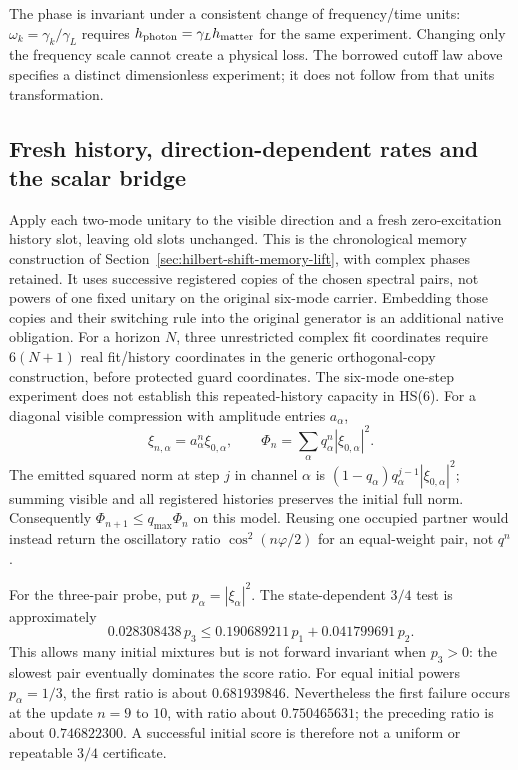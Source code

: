 \documentclass[11pt,a4paper]{article}
\begin{document}
The phase is invariant under a consistent change of frequency/time
units: $\omega_k=\gamma_k/\gamma_L$ requires
$h_{\rm photon}=\gamma_L h_{\rm matter}$ for the same experiment.
Changing only the frequency scale cannot create a physical loss.
The borrowed cutoff law above specifies a distinct dimensionless
experiment; it does not follow from that units transformation.

\subsection{Fresh history, direction-dependent rates and the scalar bridge}
Apply each two-mode unitary to the visible direction and a fresh
zero-excitation history slot, leaving old slots unchanged. This is
the chronological memory construction of
Section~\ref{sec:hilbert-shift-memory-lift}, with complex phases retained.
It uses successive registered copies of the chosen spectral pairs,
not powers of one fixed unitary on the original six-mode carrier.
Embedding those copies and their switching rule into the original
generator is an additional native obligation. For a horizon $N$,
three unrestricted complex fit coordinates require $6(N+1)$ real
fit/history coordinates in the generic orthogonal-copy construction,
before protected guard coordinates. The six-mode one-step experiment
does not establish this repeated-history capacity in HS(6).
For a diagonal visible compression with amplitude entries $a_\alpha$,
\[
 \xi_{n,\alpha}=a_\alpha^n\xi_{0,\alpha},\qquad
 \Phi_n=\sum_\alpha q_\alpha^n|\xi_{0,\alpha}|^2.
\]
The emitted squared norm at step $j$ in channel $\alpha$ is
$(1-q_\alpha)q_\alpha^{j-1}|\xi_{0,\alpha}|^2$; summing visible
and all registered histories preserves the initial full norm.
Consequently $\Phi_{n+1}\le q_{\max}\Phi_n$ on this model.
Reusing one occupied partner would instead return the oscillatory
ratio $\cos^2(n\varphi/2)$ for an equal-weight pair, not $q^n$.

For the three-pair probe, put $p_\alpha=|\xi_\alpha|^2$.
The state-dependent $3/4$ test is approximately
\[
 0.028308438\,p_3
 \le0.190689211\,p_1+0.041799691\,p_2.
\]
This allows many initial mixtures but is not forward invariant when
$p_3>0$: the slowest pair eventually dominates the score ratio.
For equal initial powers $p_\alpha=1/3$, the first ratio is about
$0.681939846$. Nevertheless the first failure occurs at the update
$n=9$ to $10$, with ratio about $0.750465631$; the preceding ratio
is about $0.746822300$. A successful initial score is therefore not
a uniform or repeatable $3/4$ certificate.
\end{document}
